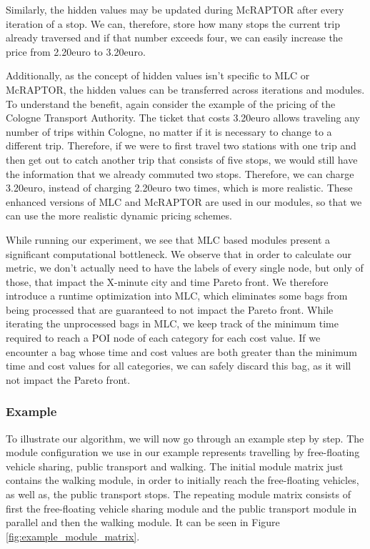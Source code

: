 Similarly, the hidden values may be updated during McRAPTOR after every iteration of a stop.
We can, therefore, store how many stops the current trip already traversed and if that number exceeds four, we can easily increase the price from 2.20euro to 3.20euro.

Additionally, as the concept of hidden values isn't specific to MLC or McRAPTOR, the hidden values can be transferred across iterations and modules.
To understand the benefit, again consider the example of the pricing of the Cologne Transport Authority.
The ticket that costs 3.20euro allows traveling any number of trips within Cologne, no matter if it is necessary to change to a different trip.
Therefore, if we were to first travel two stations with one trip and then get out to catch another trip that consists of five stops, we would still have the information that we already commuted two stops.
Therefore, we can charge 3.20euro, instead of charging 2.20euro two times, which is more realistic.
These enhanced versions of MLC and McRAPTOR are used in our modules, so that we can use the more realistic dynamic pricing schemes.

While running our experiment, we see that MLC based modules present a significant computational bottleneck.
We observe that in order to calculate our metric, we don't actually need to have the labels of every single node, but only of those, that impact the X-minute city and time Pareto front.
We therefore introduce a runtime optimization into MLC, which eliminates some bags from being processed that are guaranteed to not impact the Pareto front.
While iterating the unprocessed bags in MLC, we keep track of the minimum time required to reach a POI node of each category for each cost value.
If we encounter a bag whose time and cost values are both greater than the minimum time and cost values for all categories, we can safely discard this bag, as it will not impact the Pareto front.


\subsubsection{Example}
\label{subsubsec:example}

To illustrate our algorithm, we will now go through an example step by step.
The module configuration we use in our example represents travelling by free-floating vehicle sharing, public transport and walking.
The initial module matrix just contains the walking module, in order to initially reach the free-floating vehicles, as well as, the public transport stops.
The repeating module matrix consists of first the free-floating vehicle sharing module and the public transport module in parallel and then the walking module.
It can be seen in Figure \ref{fig:example_module_matrix}.


